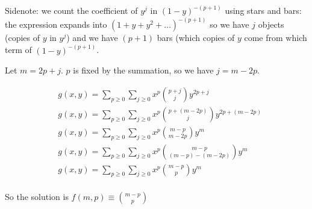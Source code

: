 \documentclass[14pt]{report}
\begin{document}
Sidenote: we count the coefficient of $y^j$ in $(1-y)^{-(p+1)}$ using stars and bars: the expression
expands into $(1 + y + y^2 + \dots)^{-(p+1)}$ so we have $j$ objects (copies of $y$ in $y^j$) and we have $(p+1)$ bars
(which copies of $y$ come from which term of $(1 - y)^{-(p+1)}$.

Let $m = 2p + j$. $p$ is fixed by the summation, so we have $j = m-2p$.

\begin{align*}
&g(x, y) = \sum_{p \geq 0}\sum_{j\geq 0} x^p \binom{p+j}{j}y^{2p+j}  \\
&g(x, y) = \sum_{p \geq 0}\sum_{j\geq 0} x^p \binom{p+(m-2p)}{j}y^{2p+(m-2p)}  \\
&g(x, y) = \sum_{p \geq 0}\sum_{j\geq 0} x^p \binom{m-p}{m-2p}y^{m}  \\
&g(x, y) = \sum_{p \geq 0}\sum_{j\geq 0} x^p \binom{m-p}{(m - p) - (m-2p)}y^{m}  \\
&g(x, y) = \sum_{p \geq 0}\sum_{j\geq 0} x^p \binom{m-p}{p}y^{m}  \\
\end{align*}


So the solution is $f(m, p) \equiv \binom{m-p}{p}$
\end{document}
